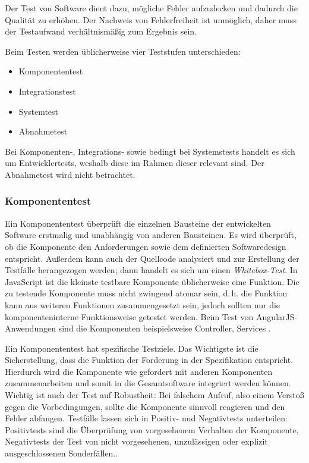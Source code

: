 Der Test von Software dient dazu, mögliche Fehler aufzudecken und dadurch die Qualität zu erhöhen. Der Nachweis von Fehlerfreiheit ist unmöglich, daher muss der Testaufwand verhältnismäßig zum Ergebnis sein\cite[][14\psqq]{spillner}. 

Beim Testen werden üblicherweise vier Teststufen unterschieden\cite[][42\psq]{spillner}:
\begin{itemize}
	\item Komponententest
	\item Integrationstest
	\item Systemtest
	\item Abnahmetest
\end{itemize}
Bei Komponenten-, Integrations- sowie bedingt bei Systemstests handelt es sich um Entwicklertests, weshalb diese im Rahmen dieser \titleDocument relevant sind. Der Abnahmetest wird nicht betrachtet.

\subsubsection{Komponententest}
Ein Komponententest überprüft die einzelnen Bausteine der entwickelten Software erstmalig und unabhängig von anderen Bausteinen. Es wird überprüft, ob die Komponente den Anforderungen sowie dem definierten Softwaredesign entspricht. Außerdem kann auch der Quellcode analysiert und zur Erstellung der Testfälle herangezogen werden; dann handelt es sich um einen \textit{Whitebox-Test}.\cite[][44]{spillner} In JavaScript ist die kleinste testbare Komponente üblicherweise eine Funktion\cite{smashing-unit}. Die zu testende Komponente muss nicht zwingend atomar sein, d.\,h. die Funktion kann aus weiteren Funktionen zusammengesetzt sein, jedoch sollten nur die komponenteninterne Funktionsweise getestet werden\cite[][45]{spillner}. Beim Test von AngularJS-Anwendungen sind die Komponenten beispielsweise Controller, Services .

Ein Komponententest hat spezifische Testziele. Das Wichtigste ist die Sicherstellung, dass die Funktion der Forderung in der Spezifikation entspricht. Hierdurch wird die Komponente wie gefordert mit anderen Komponenten zusammenarbeiten und somit in die Gesamtsoftware integriert werden können. Wichtig ist auch der Test auf Robustheit: Bei falschem Aufruf, also einem Verstoß gegen die Vorbedingungen, sollte die Komponente sinnvoll reagieren und den Fehler abfangen. Testfälle lassen sich in Positiv- und Negativtests unterteilen: Positivtests sind die Überprüfung von vorgesehenem Verhalten der Komponente, Negativtests der Test von nicht vorgesehenen, unzulässigen oder explizit ausgeschlossenen Sonderfällen.\cite[][48]{spillner}.

